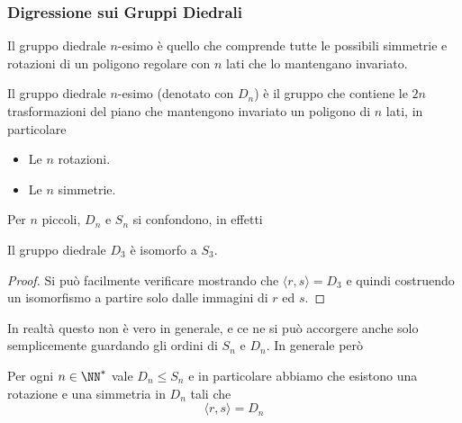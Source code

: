 \documentclass[11pt]{scrartcl}
\begin{document}
	\subsubsection{Digressione sui Gruppi Diedrali}
	Il gruppo diedrale $n$-esimo è quello che comprende tutte le possibili simmetrie e rotazioni di un poligono regolare con $n$ lati che lo mantengano invariato. 
	\begin{definition}
		Il gruppo diedrale $n$-esimo (denotato con $D_n$) è il gruppo che contiene le $2n$ trasformazioni del piano che mantengono invariato un poligono di $n$ lati, in particolare
		\begin{itemize}
			\item Le $n$ rotazioni.
			\item Le $n$ simmetrie.
		\end{itemize}
	\end{definition}
	Per $n$ piccoli, $D_n$ e $S_n$ si confondono, in effetti 
	\begin{proposition}
		Il gruppo diedrale $D_3$ è isomorfo a $S_3$. 
	\end{proposition}
	\begin{proof}
		Si può facilmente verificare mostrando che $\langle r,s \rangle=D_3$ e quindi costruendo un isomorfismo a partire solo dalle immagini di $r$ ed $s$.
	\end{proof}
	In realtà questo non è vero in generale, e ce ne si può accorgere anche solo semplicemente guardando gli ordini di $S_n$ e $D_n$. In generale però
	\begin{lemma}
		Per ogni $n\in\NN^*$ vale $D_n\le S_n$ e in particolare abbiamo che esistono una rotazione e una simmetria in $D_n$ tali che
		$$\langle r,s \rangle=D_n$$ 
	\end{lemma}
\end{document}
